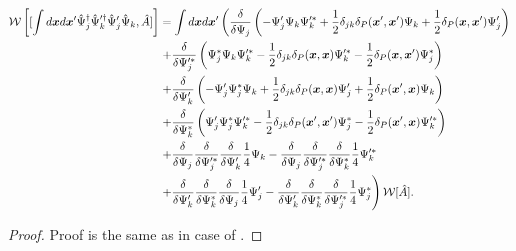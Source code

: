 \begin{theorem}
\begin{equation*}
\begin{split}
	\mathcal{W} \left[
		[
			\int d\boldsymbol{x} d\boldsymbol{x}^\prime
			\hat{\Psi}_j^\dagger \hat{\Psi}_k^{\prime\dagger} \hat{\Psi}_j^\prime \hat{\Psi}_k,
			\hat{A}
		]
	\right]
	& = \int d\boldsymbol{x} d\boldsymbol{x}^\prime \left(
		\frac{\delta}{\delta \Psi_j} \left(
			- \Psi_j^\prime \Psi_k \Psi_k^{\prime*}
			+ \frac{1}{2} \delta_{jk} \delta_P(\boldsymbol{x}^\prime, \boldsymbol{x}^\prime) \Psi_k
			+ \frac{1}{2} \delta_P(\boldsymbol{x}, \boldsymbol{x}^\prime) \Psi_j^\prime
		\right) \right . \\
	&	\left. + \frac{\delta}{\delta \Psi_j^{\prime*}} \left(
			\Psi_j^* \Psi_k \Psi_k^{\prime*}
			- \frac{1}{2} \delta_{jk} \delta_P(\boldsymbol{x}, \boldsymbol{x}) \Psi_k^{\prime*}
			- \frac{1}{2} \delta_P(\boldsymbol{x}, \boldsymbol{x}^\prime) \Psi_j^*
		\right) \right. \\
	&	\left. + \frac{\delta}{\delta \Psi_k^\prime} \left(
			- \Psi_j^\prime \Psi_j^* \Psi_k
			+ \frac{1}{2} \delta_{jk} \delta_P(\boldsymbol{x}, \boldsymbol{x}) \Psi_j^\prime
			+ \frac{1}{2} \delta_P(\boldsymbol{x}^\prime, \boldsymbol{x}) \Psi_k
		\right) \right .\\
	&	\left. + \frac{\delta}{\delta \Psi_k^*} \left(
			\Psi_j^\prime \Psi_j^* \Psi_k^{\prime*}
			- \frac{1}{2} \delta_{jk} \delta_P(\boldsymbol{x}^\prime, \boldsymbol{x}^\prime) \Psi_j^*
			- \frac{1}{2} \delta_P(\boldsymbol{x}^\prime, \boldsymbol{x}) \Psi_k^{\prime*}
		\right) \right. \\
	&	\left.
			+ \frac{\delta}{\delta \Psi_j}
			\frac{\delta}{\delta \Psi_j^{\prime*}}
			\frac{\delta}{\delta \Psi_k^\prime}
			\frac{1}{4} \Psi_k
			- \frac{\delta}{\delta \Psi_j}
			\frac{\delta}{\delta \Psi_j^{\prime*}}
			\frac{\delta}{\delta \Psi_k^*}
			\frac{1}{4} \Psi_k^{\prime*}
		\right. \\
	&	\left.
			+ \frac{\delta}{\delta \Psi_k^\prime}
			\frac{\delta}{\delta \Psi_k^*}
			\frac{\delta}{\delta \Psi_j}
			\frac{1}{4} \Psi_j^\prime
			- \frac{\delta}{\delta \Psi_k^\prime}
			\frac{\delta}{\delta \Psi_k^*}
			\frac{\delta}{\delta \Psi_j^{\prime*}}
			\frac{1}{4} \Psi_j^*
	\right) \mathcal{W}[\hat{A}].
\end{split}
\end{equation*}
\end{theorem}
\begin{proof}
Proof is the same as in case of .
\end{proof}

